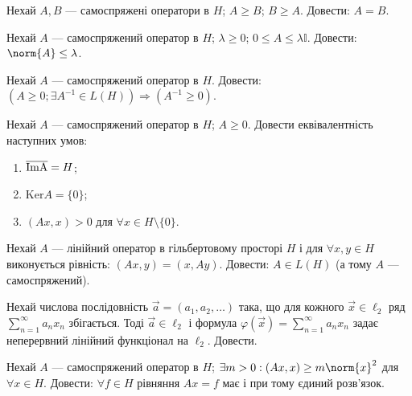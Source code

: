 
\begin{exercise}
    Нехай $A, B$ --- самоспряжені оператори в $H$; $A \geq B$; $B \geq A$.
    Довести: $A = B$.
\end{exercise}

\begin{exercise}
    Нехай $A$ --- самоспряжений оператор в $H$; $\lambda \geq 0$; $0 \leq A \leq \lambda \mathbb{I}$.
    Довести: $\norm{A} \leq \lambda$.
\end{exercise}

\begin{exercise}
    Нехай $A$ --- самоспряжений оператор в $H$. Довести:
    $ (A \geq 0; \exists A^{-1} \in L(H)) \Rightarrow (A^{-1} \geq 0)$.
\end{exercise}

\begin{exercise}
    Нехай $A$ --- самоспряжений оператор в $H$; $A \geq 0$. Довести еквівалентність наступних умов:
    \begin{enumerate}[label=\ukr*)]
        \item $\overline{\rm \mathrm{Im}A} = H$;
        \item $\mathrm{Ker}A = \{0\}$;
        \item $(Ax, x) > 0$ для $\forall x \in H \setminus \{0\}$.
    \end{enumerate}
\end{exercise}

\begin{exercise}
    Нехай $A$ --- лінійний оператор в гільбертовому просторі $H$ і для $\forall x, y \in H$ виконується
    рівність: $(Ax, y) = (x, Ay)$. Довести: $A \in L(H)$ (а тому $A$ --- самоспряжений).
\end{exercise}

\begin{exercise}
    Нехай числова послідовність $\vec{a} = (a_1, a_2, \dots)$ така, що для кожного $\vec{x} \in \ell_2$
    ряд $\sum\limits_{n = 1}^\infty a_n x_n$ збігається. Тоді $\vec{a} \in \ell_2$ і формула 
    $\varphi(\vec{x}) = \sum\limits_{n = 1}^\infty a_n x_n$ задає неперервний лінійний функціонал на $\ell_2$.
    Довести.
\end{exercise}

\begin{exercise}
    Нехай $A$ --- самоспряжений оператор в $H$; $\exists m > 0: (Ax, x) \geq m \norm{x}^2$ для $\forall x \in H$.
    Довести: $\forall f \in H$ рівняння $Ax = f$ має і при тому єдиний розв'язок.
\end{exercise}

